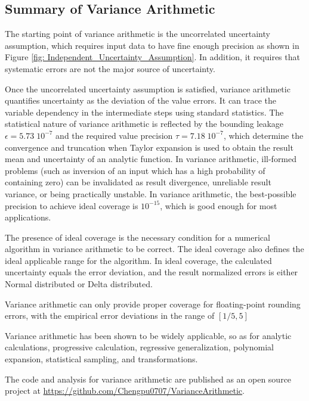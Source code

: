 \documentclass[twoside]{article}
\numberwithin{equation}{section}
\begin{document}
\subsection{Summary of Variance Arithmetic}

The starting point of variance arithmetic is the uncorrelated uncertainty assumption, which requires input data to have fine enough precision as shown in Figure \ref{fig: Independent_Uncertainty_Assumption}.  
In addition, it requires that systematic errors are not the major source of uncertainty.

Once the uncorrelated uncertainty assumption is satisfied, variance arithmetic quantifies uncertainty as the deviation of the value errors.
It can trace the variable dependency in the intermediate steps using standard statistics.
The statistical nature of variance arithmetic is reflected by the bounding leakage $\epsilon=5.73 \;10^{-7}$ and the required value precision $\tau=7.18 \;10^{-7}$, which determine the convergence and truncation when Taylor expansion is used to obtain the result mean and uncertainty of an analytic function.
In variance arithmetic, ill-formed problems (such as inversion of an input which has a high probability of containing zero) can be invalidated as result divergence, unreliable result variance, or being practically unstable.
In variance arithmetic, the best-possible precision to achieve ideal coverage is $10^{-15}$, which is good enough for most applications.

The presence of ideal coverage is the necessary condition for a numerical algorithm in variance arithmetic to be correct. 
The ideal coverage also defines the ideal applicable range for the algorithm. 
In ideal coverage, the calculated uncertainty equals the error deviation, and the result normalized errors is either Normal distributed or Delta distributed.

Variance arithmetic can only provide proper coverage for floating-point rounding errors, with the empirical error deviations in the range of $[1/5, 5]$

Variance arithmetic has been shown to be widely applicable, so as for analytic calculations, progressive calculation, regressive generalization, polynomial expansion, statistical sampling, and transformations.

The code and analysis for variance arithmetic are published as an open source project at \url{https://github.com/Chengpu0707/VarianceArithmetic}.
\end{document}
